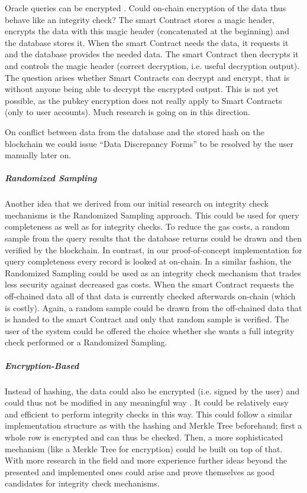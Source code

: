 Oracle queries can be encrypted \cite{futureWork01}. Could on-chain encryption of the data thus behave like an integrity check? The smart Contract stores a magic header, encrypts the data with this magic header (concatenated at the beginning) and the database stores it.
When the smart Contract needs the data, it requests it and the database provides the needed data. The smart Contract then decrypts it and controls the magic header (correct decryption, i.e. useful decryption output).
The question arises whether Smart Contracts can decrypt and encrypt, that is without anyone being able to decrypt the encrypted output. This is not yet possible, as the pubkey encryption does not really apply to Smart Contracts (only to user accounts). Much research is going on in this direction.

On conflict between data from the database and the stored hash on the blockchain we could issue “Data Discrepancy Forms” to be resolved by the user manually later on.

\subparagraph{Randomized Sampling}
Another idea that we derived from our initial research on integrity check mechanisms is the Randomized Sampling approach. This could be used for query completeness as well as for integrity checks.
To reduce the gas costs, a random sample from the query results that the database returns could be drawn and then verified by the blockchain. In contrast, in our proof-of-concept implementation for query completeness every record is looked at on-chain.
In a similar fashion, the Randomized Sampling could be used as an integrity check mechanism that trades less security against decreased gas costs. When the smart Contract requests the off-chained data all of that data is currently checked afterwards on-chain (which is costly). Again, a random sample could be drawn from the off-chained data that is handed to the smart Contract and only that random sample is verified. The user of the system could be offered the choice whether she wants a full integrity check performed or a Randomized Sampling.

\subparagraph{Encryption-Based}
Instead of hashing, the data could also be encrypted (i.e. signed by the user) and could thus not be modified in any meaningful way \cite{Eberhardt}. It could be relatively easy and efficient to perform integrity checks in this way.
This could follow a similar implementation structure as with the hashing and Merkle Tree beforehand; first a whole row is encrypted and can thus be checked. Then, a more sophisticated mechanism (like a Merkle Tree for encryption) could be built on top of that. With more research in the field and more experience further ideas beyond the presented and implemented ones could arise and prove themselves as good candidates for integrity check mechanisms.

